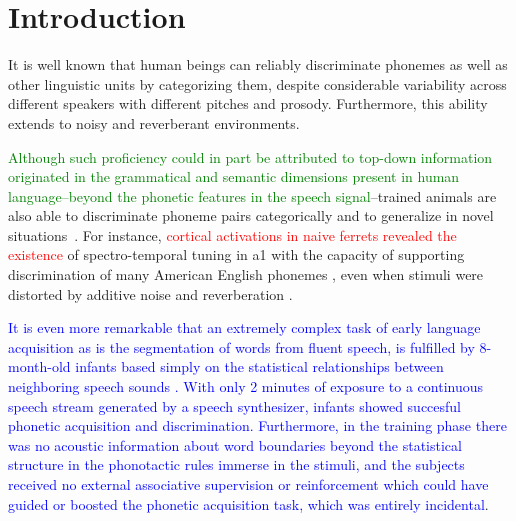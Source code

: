 \documentclass[10pt,letterpaper]{article}
\begin{document}
\linenumbers

\section*{Introduction}





It is well known that human beings can reliably discriminate phonemes as well as other linguistic units by categorizing them, despite considerable variability across different speakers with different pitches and prosody. Furthermore, this ability extends to noisy and reverberant environments.

\textcolor{green}{Although such proficiency could in part be attributed to top-down information \cite{PMID:17451657} originated in the grammatical and semantic \cite{OBLESER2011713,10.1093/cercor/bhp128} dimensions present in human language--beyond the phonetic features in the speech signal}--trained animals are also able to discriminate phoneme pairs categorically and to generalize in novel situations~\cite{kuhl_1975, kuhl_1983, kluender_1998, pons_2006, hienz_1996, dent_1997, lotto_1997}. For instance, \textcolor{red}{cortical activations in naive ferrets revealed the existence} of spectro-temporal tuning in \gls{a1} with the capacity of supporting discrimination of many American English phonemes \cite{mesgarani_2008}, even when stimuli were distorted by additive noise and reverberation \cite{mesgarani_2014A}.

\textcolor{blue}{It is even more remarkable that an extremely complex task of early language acquisition as is the segmentation of words from fluent speech, is fulfilled by 8-month-old infants based simply on the statistical relationships between neighboring speech sounds \cite{Saffran1996StatisticalLB}. With only 2 minutes of exposure to a continuous speech stream generated by a speech synthesizer, infants showed succesful phonetic acquisition and discrimination. Furthermore, in the training phase there was no acoustic information about word boundaries beyond the statistical structure in the phonotactic rules immerse in the stimuli, and the subjects received no external associative supervision or reinforcement which could have guided or boosted the phonetic acquisition task, which was entirely incidental}.
\end{document}
